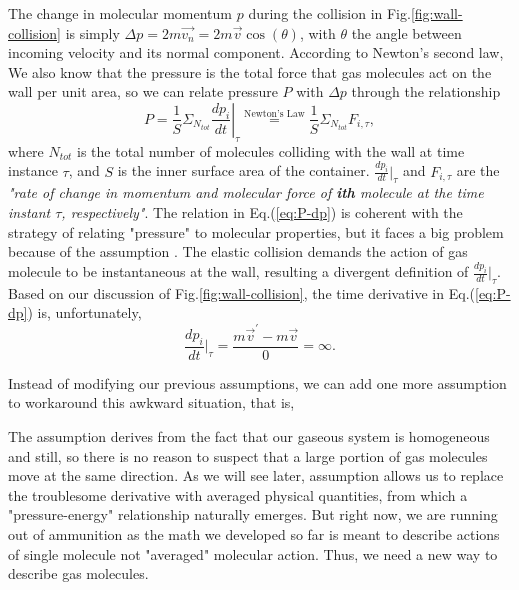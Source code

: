 The change in molecular momentum $ p $ during the collision in Fig.\ref{fig:wall-collision} is simply $ \Delta p = 2m\vec{v_n}=2m\vec{v}\cos(\theta) $, with $ \theta $ the angle between incoming velocity and its normal component. According to Newton's second law,  We also know that the pressure is the total force that gas molecules act on the wall per unit area, so we can relate pressure $ P $ with $ \Delta p $ through the relationship
\begin{equation}
	P = \frac{1}{S}\left.\Sigma_{N_{tot}}\frac{dp_i}{dt}\right|_{\tau}\overset{\text{Newton's Law}}{=}\frac{1}{S}\Sigma_{N_{tot}}F_{i,\tau},
	\label{eq:P-dp}
\end{equation}
where $ N_{tot} $ is the total number of molecules colliding with the wall at time instance $ \tau $, and $ S $ is the inner surface area of the container. $ \frac{dp_i}{dt}|_{\tau} $ and $ F_{i,\tau} $ are the \textit{"rate of change in momentum and molecular force of \textbf{ith} molecule at the time instant $ \tau $, respectively"}. The relation in Eq.(\ref{eq:P-dp}) is coherent with the strategy of relating "pressure" to molecular properties, but it faces a big problem because of the assumption . The elastic collision demands the action of gas molecule to be instantaneous at the wall, resulting a divergent definition of $ \frac{dp_i}{dt}|_{\tau} $. Based on our discussion of Fig.\ref{fig:wall-collision}, the time derivative in Eq.(\ref{eq:P-dp}) is, unfortunately,
\begin{equation}
	\frac{dp_i}{dt}|_{\tau} = \frac{m\vec{v}^{\prime}-m\vec{v}}{0}=\infty.
	\label{eq:inf-dev}
\end{equation}

Instead of modifying our previous assumptions, we can add one more assumption to workaround this awkward situation, that is,
\begin{center}
\end{center}
The assumption  derives from the fact that our gaseous system is homogeneous and still, so there is no reason to suspect that a large portion of gas molecules move at the same direction. As we will see later, assumption  allows us to replace the troublesome derivative with averaged physical quantities, from which a "pressure-energy" relationship naturally emerges. But right now, we are running out of ammunition as the math we developed so far is meant to describe actions of single molecule not "averaged" molecular action.  Thus, we need a new way to describe gas molecules.

